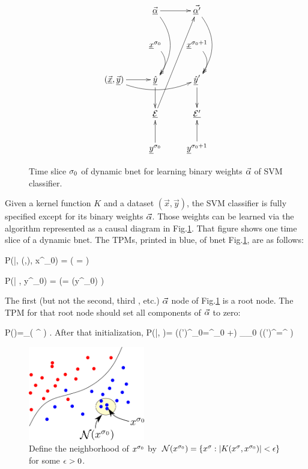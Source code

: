 \begin{figure}[h!]
$$
\xymatrix{
&\vec{\ul{\alp}}\ar@/^1.5pc/[dd]
\ar[r]
&\vec{\ul{\alp}'}\ar@/^1.5pc/[dd]
\\
&\rvx^{\s_0}\ar@/^1pc/[d]
&\rvx^{\s_0+1}\ar@/^1pc/[d]
\\
(\vec{\rvx}, \vec{\rvy})\ar[r]
\ar@/_1pc/[rr]
&\ul{\haty}\ar[d]
&\ul{\haty}'\ar[d]
\\
&\ul{\cale}\ar[ruuu]
&\ul{\cale'}
\\
&\rvy^{\s_0}\ar[u]
&\rvy^{\s_0+1}\ar[u]
}
$$
\caption{Time slice $\sigma_0$ of dynamic bnet for 
learning binary weights $\vec{\alpha}$ 
of SVM classifier.
}
\label{fig-svm-bnet}
\end{figure}

Given a kernel function $K$ and a dataset 
$(\vec{x}, \vec{y})$,
the SVM classifier is fully specified
except for its binary weights $\vec{\alpha}$.
Those weights can be learned via 
the algorithm
represented as a causal diagram  in Fig.\ref{fig-svm-bnet}.
That figure  shows one time slice
of a dynamic bnet.
The TPMs, printed in blue,
of bnet Fig.\ref{fig-svm-bnet},
are as follows:



\beq\color{blue}
P(\haty|\vec{\alp}, (,), x^{\s_0})
=
\indi(\;\;\;
\haty= 
\;\;\;)
\eeq  

\beq\color{blue}
P(\cale| \haty, y^{\s_0})
=
\indi(\;\;\;\cale =
\indi(\haty\neq y^{\s_0})
\;\;\;)
\eeq  

The first (but not the second, third , etc.)
$\vec{\alpha}$ 
node of Fig.\ref{fig-svm-bnet}
is a root node.
The TPM for that root node
should set 
all components of $\vec{\alpha}$
to zero:

\beq\color{blue}
P(\vec{\alp})=\prod_\s \indi(\;\;\;
\alp^
\;\;\;)
\;.
\eeq
After that initialization,
\beq\color{blue}
P(|\vec{\alp}, \cale)=
\indi(\;\;\;(\alp')^{\s_0}=\alp^{\s_0} +\cale\;\;\;)\;\;
\prod_{\s\neq \s_0}
\indi(\;\;\;(\alp')^\s=\alp^\s
\;\;\;)
\eeq

\begin{figure}[h!]
\centering
\includegraphics[width=2in]
{svm/svm-why.png}
\caption{Define the neighborhood
of $x^{\sigma_0}$ by  ${\cal N}(x^{\sigma_0})
=
\{x^\sigma: |K(x^\sigma,  x^{\sigma_0})|<\epsilon \}$
for some $\epsilon>0$.}
\label{fig-svm-why}
\end{figure}

